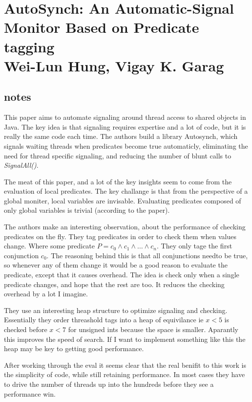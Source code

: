 \section{AutoSynch: An Automatic-Signal Monitor Based on Predicate tagging \\ 
\small{Wei-Lun Hung, Vigay K. Garag}}

\subsection{notes}

This paper aims to automate signaling around thread access to shared objects in
Java. The key idea is that signaling requires expertise and a lot of code, but
it is really the same code each time. The authors build a library Autosynch,
which signals waiting threads when predicates become true automaticly,
eliminating the need for thread specific signaling, and reducing the number of
blunt calls to \emph{SignalAll()}.

The meat of this paper, and a lot of the key insights seem to come from the
evaluation of local predicates. The key challange is that from the perspective
of a global moniter, local variables are invisable. Evaluating predicates composed of only global variables is trivial (according to the paper).

The authors make an interesting observation, about the performance of checking
predicates on the fly. They tag predicates in order to check them when values
change. Where some predicate $P = c_0 \wedge c_1 \wedge \dots \wedge c_n$. They
only tage the first conjunction $c_0$. The reasoning behind this is that all
conjunctions needto be true, so whenever any of them change it would be a good
reason to evaluate the predicate, except that it causes overhead. The idea is
check only when a single predicate changes, and hope that the rest are too. It
reduces the checking overhead by a lot I imagine.

They use an interesting heap structure to optimize signaling and checking.
Essentially they order threashold tags into a heap of equivilance ie $x < 5$ is
checked before $x < 7$ for unsigned ints because the space is smaller.
Aparantly this improves the speed of search. If I want to implement something
like this the heap may be key to getting good performance.

After working through the eval it seems clear that the real benifit to this
work is the simplicity of code, while still retaining performance. In most
cases they have to drive the number of threads up into the hundreds before they
see a performance win.

